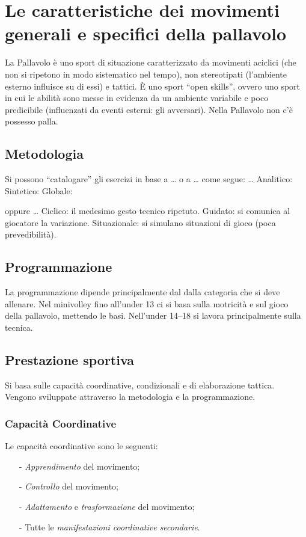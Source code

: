 \chapter{Le caratteristiche dei movimenti generali e specifici della pallavolo}

La Pallavolo è uno sport di situazione caratterizzato da movimenti aciclici (che non si ripetono in modo sistematico nel tempo), non stereotipati (l'ambiente esterno influisce su di essi) e tattici. \`E uno sport “open skills”, ovvero uno sport in cui le abilità sono messe in evidenza da un ambiente variabile e poco predicibile (influenzati da eventi esterni: gli avversari). Nella Pallavolo non c'è possesso palla.

\section{Metodologia}
Si possono “catalogare” gli esercizi in base  a … o a … come segue:
…
Analitico:
Sintetico:
Globale:

oppure … 
Ciclico: il medesimo gesto tecnico ripetuto.
Guidato: si comunica al giocatore la variazione.
Situazionale: si simulano situazioni di gioco (poca prevedibilità).

\section{Programmazione}
La programmazione dipende principalmente dal dalla categoria che si deve allenare. Nel minivolley fino all'under 13 ci si basa sulla motricità e sul gioco della pallavolo, mettendo le basi. Nell'under 14--18 si lavora principalmente sulla tecnica.

\section{Prestazione sportiva}
Si basa sulle capacità coordinative, condizionali e di elaborazione tattica. Vengono sviluppate attraverso la metodologia e la programmazione.

\subsection{Capacità Coordinative}
Le capacità coordinative sono le seguenti:
\begin{itemize}
\item[-]\emph{Apprendimento} del movimento;
\item[-]\emph{Controllo} del movimento;
\item[-]\emph{Adattamento} e \emph{trasformazione} del movimento;
\item[-]Tutte le \emph{manifestazioni coordinative secondarie}.
\end{itemize}

